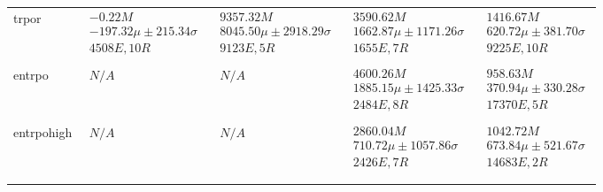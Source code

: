 \begin{tabular}{|l|p{6cm}|p{6cm}|p{6cm}|p{6cm}|}
trpor & $\begin{array}{c} -0.22M \\ -197.32\mu \pm 215.34\sigma \\ 4508E, 10R \end{array}$ & $\begin{array}{c} 9357.32M \\ 8045.50\mu \pm 2918.29\sigma \\ 9123E, 5R \end{array}$ & $\begin{array}{c} 3590.62M \\ 1662.87\mu \pm 1171.26\sigma \\ 1655E, 7R \end{array}$ & $\begin{array}{c} 1416.67M \\ 620.72\mu \pm 381.70\sigma \\ 9225E, 10R \end{array}$ \\ \\ \hline
entrpo & $\begin{array}{c} N/A \end{array}$ & $\begin{array}{c} N/A \end{array}$ & $\begin{array}{c} 4600.26M \\ 1885.15\mu \pm 1425.33\sigma \\ 2484E, 8R \end{array}$ & $\begin{array}{c} 958.63M \\ 370.94\mu \pm 330.28\sigma \\ 17370E, 5R \end{array}$ \\ \\ \hline
entrpohigh & $\begin{array}{c} N/A \end{array}$ & $\begin{array}{c} N/A \end{array}$ & $\begin{array}{c} 2860.04M \\ 710.72\mu \pm 1057.86\sigma \\ 2426E, 7R \end{array}$ & $\begin{array}{c} 1042.72M \\ 673.84\mu \pm 521.67\sigma \\ 14683E, 2R \end{array}$ \\ \\ \hline
\bottomrule \\ \hline
\end{tabular}

